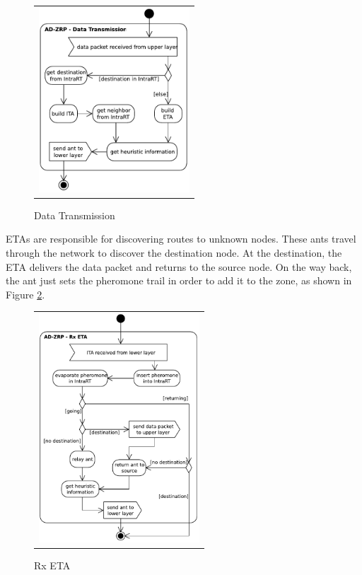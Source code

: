\documentclass[conference]{IEEEtran}
\begin{document}
\begin{figure}[htb]
\centering
\begin{tabular}{c}
\includegraphics[width=160pt]{fig/ad-zrp_data_tx.pdf}
\end{tabular}
\caption{Data Transmission}
\label{ad-zrp_data_tx}
\end{figure}

ETAs are responsible for discovering routes to unknown nodes.
These ants travel through the network to discover the destination node.
At the destination, the ETA delivers the data packet and returns to the source node.
On the way back, the ant just sets the pheromone trail in order to add it to the zone, as shown in Figure \ref{ad-zrp_rx_eta}.

\begin{figure}[htb]
\centering
\begin{tabular}{c}
\includegraphics[width=170pt]{fig/ad-zrp_rx_eta.pdf}
\end{tabular}
\caption{Rx ETA}
\label{ad-zrp_rx_eta}
\end{figure}
\end{document}
